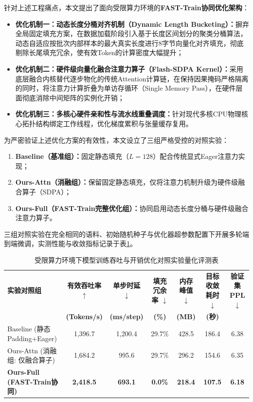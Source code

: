 \documentclass[UTF8,a4paper,zihao=-4,openany,twoside]{ctexbook}
\begin{document}
针对上述工程痛点，本文提出了面向受限算力环境的\textbf{FAST-Train协同优化架构}：
\begin{itemize}
    \item \textbf{优化机制一：动态长度分桶对齐机制（Dynamic Length Bucketing）：}摒弃全局固定填充方案，在数据加载阶段引入基于长度区间划分的聚类分桶算法，动态自适应按批次内部样本的最大真实长度进行8字节向量化对齐填充，彻底剔除长尾填充冗余，使有效Token的计算密度大幅提升；
    \item \textbf{优化机制二：硬件级向量化融合注意力算子（Flash-SDPA Kernel）：}采用底层融合内核替代逐步物化的传统Attention计算链，在保持因果掩码严格隔离的同时，将注意力计算折叠为单访存循环（Single Memory Pass），在硬件层面彻底消除中间矩阵的实例化开销；
    \item \textbf{优化机制三：多核心硬件亲和性与流水线重叠调度：}针对现代多核CPU物理核心拓扑结构绑定工作线程，优化梯度累积与张量缓存复用。
\end{itemize}

为严密验证上述优化方案的有效性，本文设立了三组严格受控的对照实验：
\begin{enumerate}
    \item \textbf{Baseline（基准组）：}固定静态填充（$L=128$）配合传统显式Eager注意力实现；
    \item \textbf{Ours-Attn（消融组）：}保留固定静态填充，仅将注意力机制升级为硬件级融合算子（SDPA）；
    \item \textbf{Ours-Full（FAST-Train完整优化组）：}协同启用动态长度分桶与硬件级融合注意力算子。
\end{enumerate}

三组对照实验在完全相同的语料、初始随机种子与优化器超参数配置下开展多轮端到端微调，实测性能与收敛指标记录于表\ref{tab:speed_optimization_comparison}。

\begin{table}[htbp]
\centering
\caption{受限算力环境下模型训练吞吐与开销优化对照实验量化评测表}
\label{tab:speed_optimization_comparison}
\begin{tabularx}{\textwidth}{lcccccc}
\toprule
\textbf{实验对照组} & \textbf{有效吞吐率 $\uparrow$} & \textbf{单步时延 $\downarrow$} & \textbf{填充冗余率 $\downarrow$} & \textbf{内存峰值 $\downarrow$} & \textbf{目标收敛耗时 $\downarrow$} & \textbf{验证集PPL $\downarrow$} \\
 & \textbf{(Tokens/s)} & \textbf{(ms/step)} & \textbf{(\%)} & \textbf{(MB)} & \textbf{(秒)} & \\
\midrule
Baseline (静态Padding+Eager) & 1,396.7 & 1,200.4 & 29.7\% & 428.5 & 186.4 & 6.38 \\
Ours-Attn (消融组: 仅融合算子) & 1,684.2 & 995.6 & 29.7\% & 296.2 & 154.6 & 6.35 \\
\textbf{Ours-Full (FAST-Train协同)} & \textbf{2,418.5} & \textbf{693.1} & \textbf{0.0\%} & \textbf{218.4} & \textbf{107.5} & \textbf{6.18} \\
\bottomrule
\end{tabularx}
\end{table}
\end{document}
